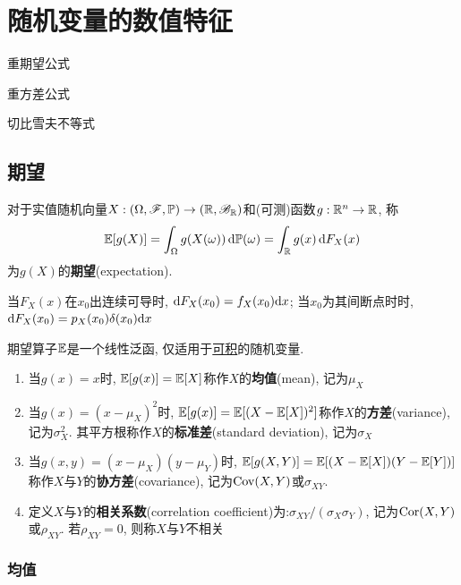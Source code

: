 \chapter{随机变量的数值特征}
\begin{introduction}[考试重点]
    \item 重期望公式
    \item 重方差公式
    \item 切比雪夫不等式
\end{introduction}
\section{期望}

\begin{definition}
    对于实值随机向量$X : (\Omega,\mathscr{F},\mathbb{P}) \to (\mathbb{R},\mathscr{B}_{\mathbb{R}})$和(可测)函数$g : \mathbb{R}^n \to \mathbb{R}$, 称
    \[ \mathbb{E}[g(X)] = \int_{\Omega} g(X(\omega))\,\mathrm{d}\mathbb{P}(\omega) = \int_{\mathbb{R}} g(x) \,\mathrm{d} F_{X}(x) \]
    为$g(X)$的\textbf{期望}(expectation).
\end{definition}

\begin{remark}
    当$F_{X}(x)$在$x_0$出连续可导时, $\mathrm{d} F_{X}(x_0)=f_{X}(x_0)\mathrm{d} x$; 当$x_0$为其间断点时时, $\mathrm{d} F_{X}(x_0)=p_{X}(x_0)\delta(x_0)\mathrm{d} x$
\end{remark}

期望算子$\mathbb{E}$是一个线性泛函, 仅适用于\underline{可积}的随机变量.

\begin{definition}
    \begin{enumerate}
        \item 当$g(x)=x$时, $\mathbb{E}[g(x)]=\mathbb{E}[X]$称作$X$的\textbf{均值}(mean), 记为$\mu_{X}$
        \item 当$g(x)=(x-\mu_{X})^{2}$时, $\mathbb{E}[g(x)]=\mathbb{E}[(X-\mathbb{E}[X])^{2}]$称作$X$的\textbf{方差}(variance), 记为$\sigma^2_{X}$. 其平方根称作$X$的\textbf{标准差}(standard deviation), 记为$\sigma_{X}$
        \item 当$g(x,y)=(x-\mu_{X})(y-\mu_{Y})$时, $\mathbb{E}[g(X,Y)]=\mathbb{E}[(X-\mathbb{E}[X])(Y-\mathbb{E}[Y])]$称作$X$与$Y$的\textbf{协方差}(covariance), 记为$\operatorname{Cov}(X,Y)$或$\sigma_{XY}$.
        \item 定义$X$与$Y$的\textbf{相关系数}(correlation coefficient)为:$\sigma_{XY}/(\sigma_{X}\sigma_{Y})$, 记为$\operatorname{Cor}(X,Y)$或$\rho_{XY}$. 若$\rho_{XY}=0$, 则称$X$与$Y$不相关
    \end{enumerate}
\end{definition}

\subsection{均值}

